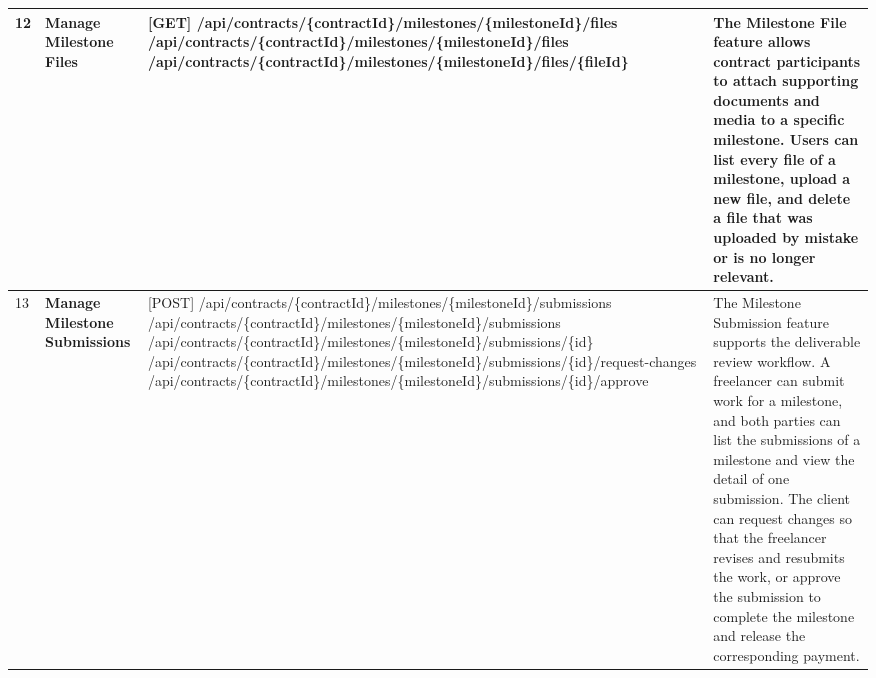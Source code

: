 \begin{longtable}{|C{0.7cm}|L{2.6cm}|S{6.6cm}|L{5.2cm}|}
12
&
\textbf{Manage Milestone Files}
&
[GET] /\allowbreak{}api/\allowbreak{}contracts/\allowbreak{}\{contractId\}/\allowbreak{}milestones/\allowbreak{}\{milestoneId\}/\allowbreak{}files \newline
[POST] /\allowbreak{}api/\allowbreak{}contracts/\allowbreak{}\{contractId\}/\allowbreak{}milestones/\allowbreak{}\{milestoneId\}/\allowbreak{}files \newline
[DELETE] /\allowbreak{}api/\allowbreak{}contracts/\allowbreak{}\{contractId\}/\allowbreak{}milestones/\allowbreak{}\{milestoneId\}/\allowbreak{}files/\allowbreak{}\{fileId\}
&
The Milestone File feature allows contract participants to attach supporting documents and media to a specific milestone. Users can list every file of a milestone, upload a new file, and delete a file that was uploaded by mistake or is no longer relevant.
\\ \hline

13
&
\textbf{Manage Milestone Submissions}
&
[POST] /\allowbreak{}api/\allowbreak{}contracts/\allowbreak{}\{contractId\}/\allowbreak{}milestones/\allowbreak{}\{milestoneId\}/\allowbreak{}submissions \newline
[GET] /\allowbreak{}api/\allowbreak{}contracts/\allowbreak{}\{contractId\}/\allowbreak{}milestones/\allowbreak{}\{milestoneId\}/\allowbreak{}submissions \newline
[GET] /\allowbreak{}api/\allowbreak{}contracts/\allowbreak{}\{contractId\}/\allowbreak{}milestones/\allowbreak{}\{milestoneId\}/\allowbreak{}submissions/\allowbreak{}\{id\} \newline
[PATCH] /\allowbreak{}api/\allowbreak{}contracts/\allowbreak{}\{contractId\}/\allowbreak{}milestones/\allowbreak{}\{milestoneId\}/\allowbreak{}submissions/\allowbreak{}\{id\}/\allowbreak{}request-changes \newline
[PATCH] /\allowbreak{}api/\allowbreak{}contracts/\allowbreak{}\{contractId\}/\allowbreak{}milestones/\allowbreak{}\{milestoneId\}/\allowbreak{}submissions/\allowbreak{}\{id\}/\allowbreak{}approve
&
The Milestone Submission feature supports the deliverable review workflow. A freelancer can submit work for a milestone, and both parties can list the submissions of a milestone and view the detail of one submission. The client can request changes so that the freelancer revises and resubmits the work, or approve the submission to complete the milestone and release the corresponding payment.
\\ \hline


\end{longtable}
